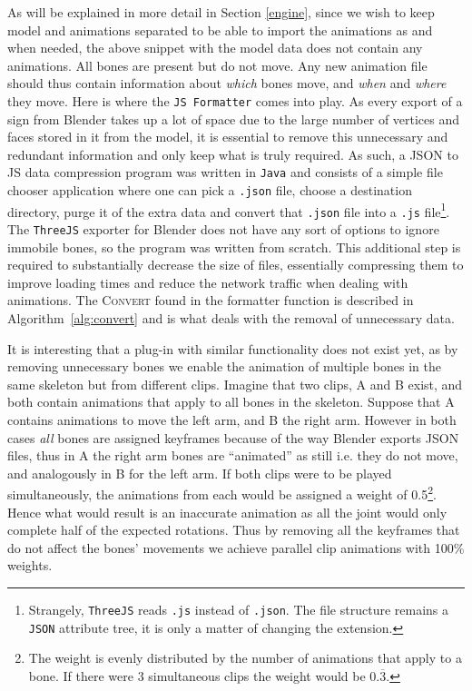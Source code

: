 \documentclass[12pt]{ociamthesis}  %
\newcommand{\tech}{\texttt}
\begin{document}
As will be explained in more detail in Section \ref{engine}, since we wish to keep model and animations separated to be able to import the animations as and when needed, the above snippet with the model data does not contain any animations. All bones are present but do not move. Any new animation file should thus contain information about \textit{which} bones move, and \textit{when} and \textit{where} they move. Here is where the \tech{JS Formatter} comes into play. As every export of a sign from Blender takes up a lot of space due to the large number of vertices and faces stored in it from the model, it is essential to remove this unnecessary and redundant information and only keep what is truly required. As such, a JSON to JS data compression program was written in \tech{Java} and consists of a simple file chooser application where one can pick a \texttt{.json} file, choose a destination directory, purge it of the extra data and convert that \texttt{.json} file into a \texttt{.js} file\footnote{Strangely, \tech{ThreeJS} reads \texttt{.js} instead of \texttt{.json}. The file structure remains a \tech{JSON} attribute tree, it is only a matter of changing the extension.}. The \tech{ThreeJS} exporter for Blender does not have any sort of options to ignore immobile bones, so the program was written from scratch. This additional step is required to substantially decrease the size of files, essentially compressing them to improve loading times and reduce the network traffic when dealing with animations. The \textsc{Convert} found in the formatter function is described in Algorithm~\ref{alg:convert} and is what deals with the removal of unnecessary data. 

It is interesting that a plug-in with similar functionality does not exist yet, as by removing unnecessary bones we enable the animation of multiple bones in the same skeleton but from different clips. Imagine that two clips, A and B exist, and both contain animations that apply to all bones in the skeleton. Suppose that A contains animations to move the left arm, and B the right arm. However in both cases \textit{all} bones are assigned keyframes because of the way Blender exports JSON files, thus in A the right arm bones are ``animated'' as still i.e. they do not move, and analogously in B for the left arm. If both clips were to be played simultaneously, the animations from each would be assigned a weight of 0.5\footnote{The weight is evenly distributed by the number of animations that apply to a bone. If there were 3 simultaneous clips the weight would be $0.\overline{3}$.}. Hence what would result is an inaccurate animation as all the joint would only complete half of the expected rotations. Thus by removing all the keyframes that do not affect the bones' movements we achieve parallel clip animations with 100\% weights.
\end{document}

